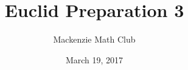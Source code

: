 

\usepackage{cleveref}
\usepackage{tikz}
\usepackage{tkz-euclide}
\usetikzlibrary{angles,quotes}

\title{Euclid Preparation 3}
\author{Mackenzie Math Club}
\date{March 19, 2017}


\theoremstyle{definition}
\newtheorem{theorem}{Theorem}
\newtheorem{extension}{Extension}[theorem]
\newtheorem*{properties}{Properties}

\newenvironment{TheoremSide}[1]{\begin{minipage}{0.7\textwidth}\begin{theorem}[#1]~\\}{\end{theorem}\end{minipage}}
\newenvironment{ExtensionSide}[1]{\begin{minipage}{0.7\textwidth}\begin{extension}[#1]~\\}{\end{extension}\end{minipage}}
\newenvironment{DiagramSide}{\begin{minipage}[c][4cm]{0.3\textwidth}\centering}{\end{minipage}}
\newenvironment{PropertiesSide}[1]{\begin{minipage}{0.7\textwidth}\begin{properties}[#1]~\\}{\end{properties}\end{minipage}}


